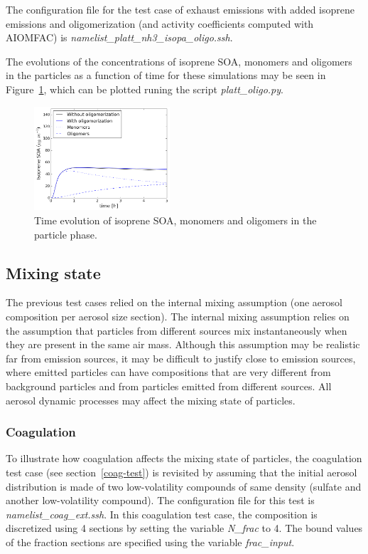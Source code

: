 \documentclass[a4paper,11pt]{article}
\begin{document}
The configuration file for the test case of exhaust emissions with added isoprene emissions and oligomerization (and activity coefficients computed with AIOMFAC) is {\it{namelist\_platt\_nh3\_isopa\_oligo.ssh}}.
  
The evolutions of the concentrations of isoprene SOA, monomers and oligomers in the particles as a function of time for these simulations may be seen in Figure~\ref{fig-platt-oligo}, which can be plotted runing the script {\it{platt\_oligo.py}}.
\begin{figure}[H]
        \begin{center}
                \includegraphics[angle=0,width=0.45\textwidth]{../graph/figure_ref/platt-oligo.png}
        \end{center}
	\caption{Time evolution of isoprene SOA, monomers and oligomers in the particle phase.}
\label{fig-platt-oligo}
\end{figure}

\subsection{Mixing state}
The previous test cases relied on the internal mixing assumption (one aerosol
composition per aerosol size section).
The internal mixing assumption relies on the assumption that particles from different sources
mix instantaneously when they are present in the same air mass. Although this assumption may
be realistic far from emission sources, it may be difficult to justify close to emission sources,
where emitted particles can have compositions that are very different from background particles
and from particles emitted from different sources.
All aerosol dynamic processes may affect the mixing state of particles.

\subsubsection{Coagulation}

To illustrate how coagulation affects the mixing state of particles, the
coagulation test case (see section~\ref{coag-test}) is revisited by assuming
that the initial aerosol distribution is made of two low-volatility compounds
of same density (sulfate and another low-volatility compound).
The configuration file for this test is {\it{namelist\_coag\_ext.ssh}}.
In this coagulation test case, the composition is discretized using 4 sections
by setting the variable {\it{N\_frac}} to 4. The bound values of the fraction
sections are specified using the variable {\it{frac\_input}}.
\end{document}
